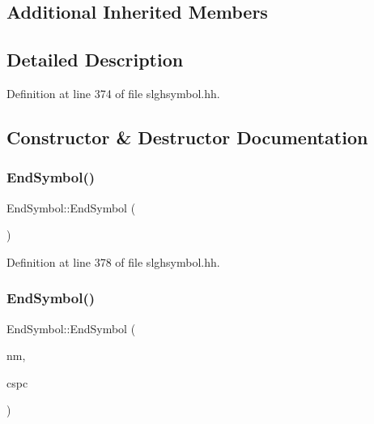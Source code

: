 \subsection*{Additional Inherited Members}


\subsection{Detailed Description}


Definition at line 374 of file slghsymbol.\+hh.



\subsection{Constructor \& Destructor Documentation}
\mbox{\label{class_end_symbol_a1b3175a92a757b3d22e8a311421b57f3}} 
\subsubsection{\texorpdfstring{EndSymbol()}{EndSymbol()}\hspace{0.1cm}{\footnotesize\ttfamily [1/2]}}
{\footnotesize\ttfamily End\+Symbol\+::\+End\+Symbol (\begin{DoxyParamCaption}\item[{void}]{ }\end{DoxyParamCaption})\hspace{0.3cm}{\ttfamily [inline]}}



Definition at line 378 of file slghsymbol.\+hh.

\mbox{\label{class_end_symbol_a796ceddba9cf357f920b8e3bca6b14ab}} 
\subsubsection{\texorpdfstring{EndSymbol()}{EndSymbol()}\hspace{0.1cm}{\footnotesize\ttfamily [2/2]}}
{\footnotesize\ttfamily End\+Symbol\+::\+End\+Symbol (\begin{DoxyParamCaption}\item[{const string \&}]{nm,  }\item[{\mbox{\hyperlink{class_addr_space}{Addr\+Space}} $\ast$}]{cspc }\end{DoxyParamCaption})}



